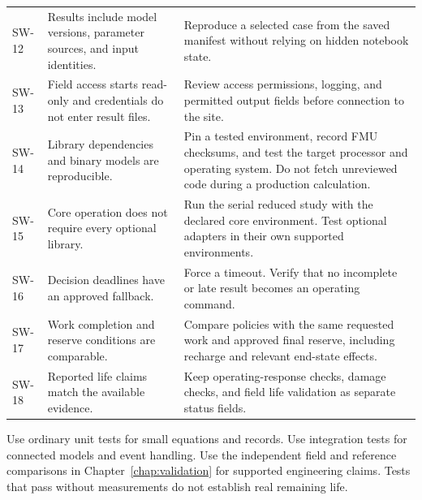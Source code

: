 \documentclass[11pt,a4paper]{report}
\begin{document}
\begin{longtable}{L{0.12\textwidth}L{0.40\textwidth}L{0.36\textwidth}}
SW-12 & Results include model versions, parameter sources, and input identities. & Reproduce a selected case from the saved manifest without relying on hidden notebook state. \\
SW-13 & Field access starts read-only and credentials do not enter result files. & Review access permissions, logging, and permitted output fields before connection to the site. \\
SW-14 & Library dependencies and binary models are reproducible. & Pin a tested environment, record FMU checksums, and test the target processor and operating system. Do not fetch unreviewed code during a production calculation. \\
SW-15 & Core operation does not require every optional library. & Run the serial reduced study with the declared core environment. Test optional adapters in their own supported environments. \\
SW-16 & Decision deadlines have an approved fallback. & Force a timeout. Verify that no incomplete or late result becomes an operating command. \\
SW-17 & Work completion and reserve conditions are comparable. & Compare policies with the same requested work and approved final reserve, including recharge and relevant end-state effects. \\
SW-18 & Reported life claims match the available evidence. & Keep operating-response checks, damage checks, and field life validation as separate status fields. \\
\bottomrule
\end{longtable}

Use ordinary unit tests for small equations and records.
Use integration tests for connected models and event handling.
Use the independent field and reference comparisons in Chapter~\ref{chap:validation} for supported engineering claims.
Tests that pass without measurements do not establish real remaining life.
\end{document}
